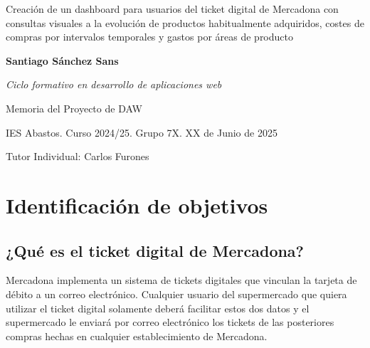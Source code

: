 \documentclass[a4paper,12pt]{report}
\begin{document}
	
	

	
	
	
	\begin{titlepage}
		\begin{center}

			
			\vspace*{5cm} 

			\LARGE{Creación de un dashboard para usuarios del ticket digital de Mercadona con consultas visuales a la evolución de productos habitualmente adquiridos, costes de compras por intervalos temporales y gastos por áreas de producto}
			
			\vfill
			
		\begin{flushright}
			\large{\textbf{Santiago Sánchez Sans}}
			
			\large{\textit{Ciclo formativo en desarrollo de aplicaciones web}}
			
			\large{Memoria del Proyecto de DAW}
			
			\large{IES Abastos. Curso 2024/25. Grupo 7X. XX de Junio de 2025}
			
			\large{Tutor Individual: Carlos Furones}
		\end{flushright}

			
			
			
			
		\end{center}
	\end{titlepage}
	
	\tableofcontents
	\newpage
	
	
	
	
	
	
	
	
	\begingroup
	\setlength{\parskip}{.7em}
	
	
	\chapter{Identificación de objetivos}

		\section{¿Qué es el ticket digital de Mercadona?}
		
		Mercadona implementa un sistema de tickets digitales que vinculan la tarjeta de débito a un correo electrónico. Cualquier usuario del supermercado que quiera utilizar el ticket digital solamente deberá facilitar estos dos datos y el supermercado le enviará por correo electrónico los tickets de las posteriores compras hechas en cualquier establecimiento de Mercadona.
		
\end{document}
